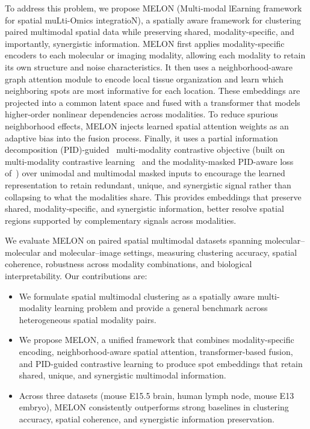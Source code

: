 \documentclass{article}
\theoremstyle{plain}
\theoremstyle{definition}
\begin{document}
To address this problem, we propose MELON (Multi-modal lEarning framework for spatial muLti-Omics integratioN), a spatially aware framework for clustering paired multimodal spatial data while preserving shared, modality-specific, and importantly, synergistic information. MELON first applies modality-specific encoders to each molecular or imaging modality, allowing each modality to retain its own structure and noise characteristics. It then uses a neighborhood-aware graph attention module to encode local tissue organization and learn which neighboring spots are most informative for each location. These embeddings are projected into a common latent space and fused with a transformer that models higher-order nonlinear dependencies across modalities. To reduce spurious neighborhood effects, MELON injects learned spatial attention weights as an adaptive bias into the fusion process. Finally, it uses a partial information decomposition (PID)-guided~\cite{williams2010nonnegative,bertschinger2014quantifying} multi-modality contrastive objective (built on multi-modality contrastive learning~\cite{tian2020contrastive} and the modality-masked PID-aware loss of~\cite{dufumier2024align}) over unimodal and multimodal masked inputs to encourage the learned representation to retain redundant, unique, and synergistic signal rather than collapsing to what the modalities share. This provides embeddings that preserve shared, modality-specific, and synergistic information, better resolve spatial regions supported by complementary signals across modalities.

We evaluate MELON on paired spatial multimodal datasets spanning molecular--molecular and molecular--image settings, measuring clustering accuracy, spatial coherence, robustness across modality combinations, and biological interpretability. Our contributions are:
\begin{itemize}
  \item We formulate spatial multimodal clustering as a spatially aware multi-modality learning problem and provide a general benchmark across heterogeneous spatial modality pairs.
  \item We propose MELON, a unified framework that combines modality-specific encoding, neighborhood-aware spatial attention, transformer-based fusion, and PID-guided contrastive learning to produce spot embeddings that retain shared, unique, and synergistic multimodal information.
  \item Across three datasets (mouse E15.5 brain, human lymph node, mouse E13 embryo), MELON consistently outperforms strong baselines in clustering accuracy, spatial coherence, and synergistic information preservation.
\end{itemize}
\end{document}
